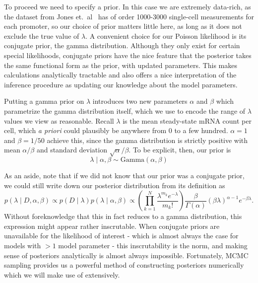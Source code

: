 To proceed we need to specify a prior. In this case we are extremely data-rich,
as the dataset from Jones et.\ al~\cite{Jones2014} has of order 1000-3000
single-cell measurements for each promoter, so our choice of prior matters
little here, as long as it does not exclude the true value of $\lambda$. A
convenient choice for our Poisson likelihood is its conjugate prior, the gamma
distribution. Although they only exist for certain special likelihoods,
conjugate priors have the nice feature that the posterior takes the same
functional form as the prior, with updated parameters. This makes calculations
analytically tractable and also offers a nice interpretation of the inference
procedure as updating our knowledge about the model parameters.

Putting a gamma prior on $\lambda$ introduces two new parameters $\alpha$ and
$\beta$ which parametrize the gamma distribution itself, which we use to encode
the range of $\lambda$ values we view as reasonable. Recall $\lambda$ is the
mean steady-state mRNA count per cell, which \textit{a priori} could plausibly
be anywhere from 0 to a few hundred. $\alpha=1$ and $\beta=1/50$ achieve this,
since the gamma distribution is strictly positive with mean $\alpha/\beta$ and
standard deviation $\sqrt{\alpha}/\beta$. To be explicit, then, our prior is
\begin{equation}
\lambda\mid\alpha,\beta \sim \text{Gamma}(\alpha, \beta)
\end{equation}

As an aside, note that if we did not know that our prior was a conjugate prior,
we could still write down our posterior distribution from its definition as
\begin{equation}
p(\lambda\mid D,\alpha,\beta)
\propto p(D\mid\lambda) p(\lambda \mid\alpha,\beta)
\propto \left(\prod_{k=1}^N \frac{\lambda^{m_k}e^{-\lambda}}{m_k!}\right)
        \frac{\beta}{\Gamma(\alpha)}(\beta\lambda)^{\alpha-1} e^{-\beta\lambda}
.
\end{equation}
Without foreknowledge that this in fact reduces to a gamma distribution, this
expression might appear rather inscrutable. When conjugate priors are
unavailable for the likelihood of interest - which is almost always the case for
models with $>1$ model parameter - this inscrutability is the norm, and making
sense of posteriors analytically is almost always impossible. Fortunately, MCMC
sampling provides us a powerful method of constructing posteriors numerically
which we will make use of extensively.

